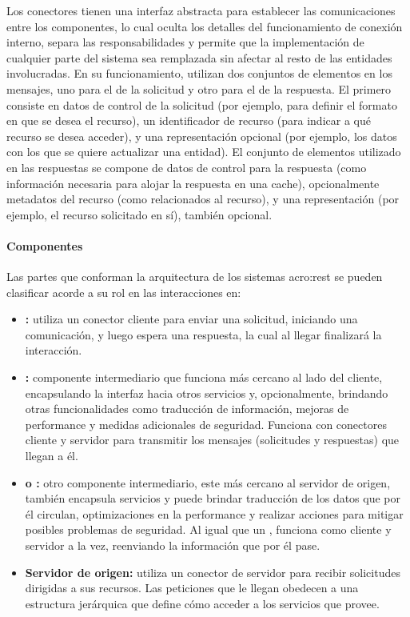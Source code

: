 Los conectores tienen una interfaz abstracta para establecer las comunicaciones entre los componentes, lo cual oculta los detalles del funcionamiento de conexión interno, separa las responsabilidades y permite que la implementación de cualquier parte del sistema sea remplazada sin afectar al resto de las entidades involucradas. En su funcionamiento, utilizan dos conjuntos de elementos en los mensajes, uno para el de la solicitud y otro para el de la respuesta. El primero consiste en datos de control de la solicitud (por ejemplo, para definir el formato en que se desea el recurso), un identificador de recurso (para indicar a qué recurso se desea acceder), y una representación opcional (por ejemplo, los datos con los que se quiere actualizar una entidad). El conjunto de elementos utilizado en las respuestas se compone de datos de control para la respuesta (como información necesaria para alojar la respuesta en una cache), opcionalmente metadatos del recurso (como  relacionados al recurso), y una representación (por ejemplo, el recurso solicitado en sí), también opcional.


\paragraph{Componentes}

Las partes que conforman la arquitectura de los sistemas \gls{acro:rest} se pueden clasificar acorde a su rol en las interacciones en:

\begin{itemize}
  \item \textbf{:} utiliza un conector cliente para enviar una solicitud, iniciando una comunicación, y luego espera una respuesta, la cual al llegar finalizará la interacción.

  \item \textbf{:} componente intermediario que funciona más cercano al lado del cliente, encapsulando la interfaz hacia otros servicios y, opcionalmente, brindando otras funcionalidades como traducción de información, mejoras de performance y medidas adicionales de seguridad. Funciona con conectores cliente y servidor para transmitir los mensajes (solicitudes y respuestas) que llegan a él.

  \item \textbf{ o :} otro componente intermediario, este más cercano al servidor de origen, también encapsula servicios y puede brindar traducción de los datos que por él circulan, optimizaciones en la performance y realizar acciones para mitigar posibles problemas de seguridad. Al igual que un , funciona como cliente y servidor a la vez, reenviando la información que por él pase.

  \item \textbf{Servidor de origen:} utiliza un conector de servidor para recibir solicitudes dirigidas a sus recursos. Las peticiones que le llegan obedecen a una estructura jerárquica que define cómo acceder a los servicios que provee.
\end{itemize}
